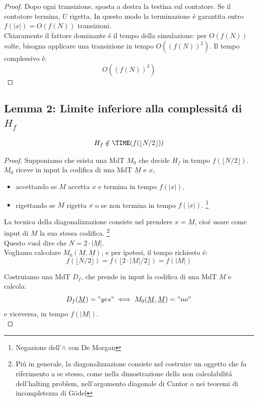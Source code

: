 \begin{proof}
Dopo ogni transizione, sposta a destra la testina sul contatore. 
Se il contatore termina, $U$ rigetta.
In questo modo la terminazione é garantita entro $f(|x|) = O(f(N))$ transizioni.\\

Chiaramente il fattore dominante é il tempo della simulazione: 
per $O(f(N))$ volte, bisogna applicare una transizione in tempo $O((f(N))^2)$. 
Il tempo complessivo é:
\[O((f(N))^3)\]
\end{proof}

\newpage
\subsection{Lemma 2: Limite inferiore alla complessitá di $H_f$}
\[H_f \notin \TIME(f(\lfloor N/2 \rfloor))\]
\begin{proof}
Supponiamo che esista una MdT $M_0$ che decide $H_f$ in tempo $f(\lfloor N/2 \rfloor)$. \\
$M_0$ riceve in input la codifica di una MdT $\underline{M}$ e $x$,
\begin{itemize}
    \item accettando se $M$ accetta $x$ e termina in tempo $f(|x|)$,
    \item rigettando se $M$ rigetta $x$ o se non termina in tempo $f(|x|)$. 
        \footnote{Negazione dell'$\land$ con De Morgan}
\end{itemize}

La tecnica della diagonalizzazione consiste nel prendere $x = \underline{M}$, 
cioé usare come input di $M$ la sua stessa codifica. 
\footnote{Piú in generale, la diagonalizzazione consiste nel costruire un oggetto che fa riferimento a se stesso, come nella dimostrazione della non calcolabilitá dell'halting problem, nell'argomento diagonale di Cantor o nei teoremi di incompletezza di Gödel} \\
Questo vuol dire che $N = 2 \cdot |\underline{M}|$. \\

Vogliamo calcolare $M_0(\underline{M}, \underline{M})$, e per ipotesi, il tempo richiesto é:
\[f(\lfloor N/2 \rfloor) = f(\lfloor 2 \cdot |\underline{M}|/2 \rfloor) = f( |\underline{M}| )\]

Costruiamo una MdT $D_f$, che prende in input la codifica di una MdT $M$
e calcola: 
\[D_f(\underline{M}) = "yes" \iff M_0(\underline{M}, \underline{M}) = "no"\] 
e viceversa, in tempo $f(|\underline{M}|)$. \\


\end{proof}

